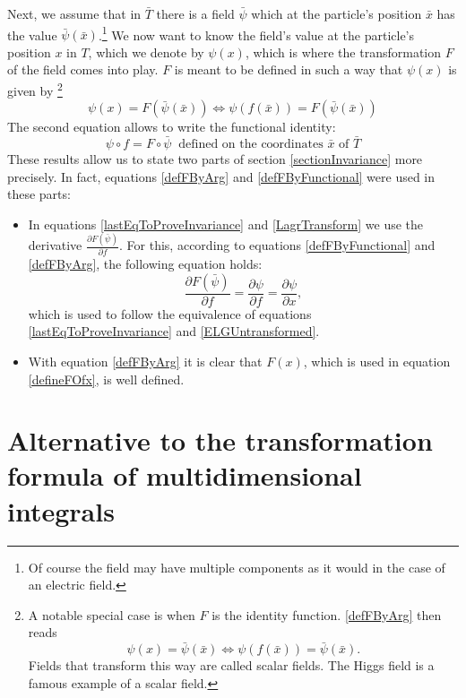 \documentclass[prb,preprint]{revtex4-1}
\begin{document}
Next, we assume that in $\bar{T}$ there is a field $\bar{\psi}$ which at the particle's position $\bar{x}$ has the value $\bar{\psi}(\bar{x})$.\footnote{Of course the field may have multiple components as it would in the case of an electric field.}
We now want to know the field's value at the particle's position $x$ in $T$, which we denote by $\psi(x)$, which is where the transformation $F$ of the field comes into play.
$F$ is meant to be defined in such a way that $\psi(x)$ is given by
\footnote{A notable special case is when $F$ is the identity function.
\eqref{defFByArg} then reads $$\psi(x) = \bar{\psi}(\bar{x}) \iff \psi(f(\bar{x})) = \bar{\psi}(\bar{x}).$$
Fields that transform this way are called scalar fields.
The Higgs field is a famous example of a scalar field.}
\begin{equation} \label{defFByArg}
  \psi(x) = F(\bar{\psi}(\bar{x})) \iff \psi(f(\bar{x})) = F(\bar{\psi}(\bar{x}))
\end{equation}
The second equation allows to write the functional identity:
\begin{equation} \label{defFByFunctional}
  \psi \circ f = F \circ \bar{\psi} \;\; \text{defined on the coordinates $\bar{x}$ of $\bar{T}$}
\end{equation}
These results allow us to state two parts of section \ref{sectionInvariance} more precisely.
In fact, equations \eqref{defFByArg} and \eqref{defFByFunctional} were used in these parts:
\begin{itemize}
  \item
  In equations \eqref{lastEqToProveInvariance} and \eqref{LagrTransform} we use the derivative $\frac{\partial F(\bar{\psi})}{\partial f}$.
  For this, according to equations \eqref{defFByFunctional} and \eqref{defFByArg}, the following equation holds:
  \begin{equation}
    \frac{\partial F(\bar{\psi})}{\partial f} = \frac{\partial \psi}{\partial f} = \frac{\partial \psi}{\partial x},
  \end{equation}
  which is used to follow the equivalence of equations \eqref{lastEqToProveInvariance} and \eqref{ELGUntransformed}.
  \item
  With equation \eqref{defFByArg} it is clear that $F(x)$, which is used in equation \eqref{defineFOfx}, is well defined.
\end{itemize}


\section{Alternative to the transformation formula of multidimensional integrals} \label{TranformationFormula}
\end{document}
